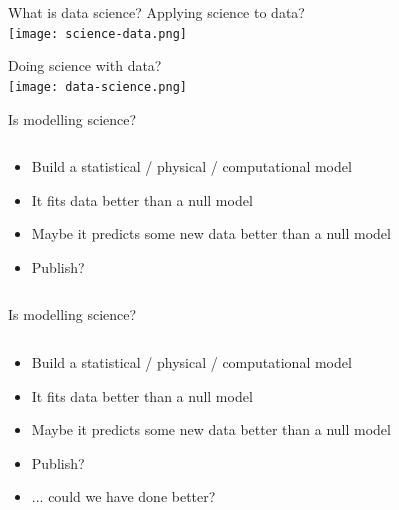 \documentclass[10pt]{beamer}
\begin{document}
\begin{frame}{What is data science?}
   Applying science to data?  \\
  \texttt{[image: science-data.png]} 
  
 
  Doing science with data?  \\
  \texttt{[image: data-science.png]} 
  
  \end{frame}

\begin{frame}{Is modelling science?}
  \begin{columns}
    \begin{column}{0.4\textwidth}
  \begin{itemize}
  \item Build a statistical / physical / computational model
  \item It fits data better than a null model
    \item Maybe it predicts some new data better than a null model
    \item Publish?
  \end{itemize}
    \end{column}
    \begin{column}{0.6\textwidth}
    \end{column}
        \end{columns}
\end{frame}
\begin{frame}{Is modelling science?}
  \begin{columns}
    \begin{column}{0.4\textwidth}
  \begin{itemize}
  \item Build a statistical / physical / computational model
  \item It fits data better than a null model
    \item Maybe it predicts some new data better than a null model
    \item Publish?
      \item ... could we have done better?
  \end{itemize}
    \end{column}
    \begin{column}{0.6\textwidth}
    \end{column}
        \end{columns}
\end{frame}
\end{document}
